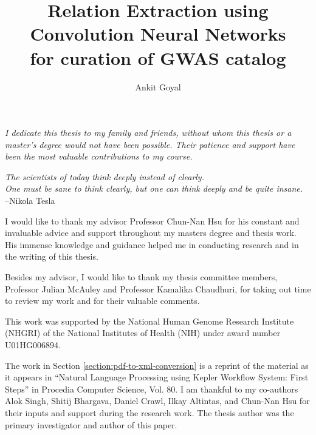 
\title{
Relation Extraction using Convolution Neural Networks\\ 
for curation of GWAS catalog
}

\author{Ankit Goyal}




\begin{frontmatter}

\makefrontmatter

\begin{dedication}
{\it I dedicate this thesis to my family and friends, without whom this thesis or a master's degree would not have been possible. Their patience and support have been the most valuable contributions to my course.}
\end{dedication}

\begin{epigraph}
{\it The scientists of today think deeply instead of clearly. \\
One must be sane to think clearly, but one can think deeply and be quite insane.} \\
\vspace{0.2in}
\textup{--Nikola Tesla}
\end{epigraph}

\tableofcontents
\listoffigures  
\listoftables  

\begin{acknowledgements}
 
I would like to thank my advisor Professor Chun-Nan Hsu for his constant and invaluable advice and support throughout my masters degree and thesis work. His immense knowledge and guidance helped me in conducting research and in the writing of this thesis. 

Besides my advisor, I would like to thank my thesis committee members, Professor Julian McAuley and Professor Kamalika Chaudhuri, for taking out time to review my work and for their valuable comments. 

This work was supported by the National Human Genome Research Institute (NHGRI) of the National Institutes of Health (NIH) under award number U01HG006894.

The work in Section \ref{section:pdf-to-xml-conversion} is a reprint of the material as it appears in ``Natural Language Processing using Kepler Workflow System: First Steps'' in Procedia Computer Science, Vol. 80. I am thankful to my co-authors Alok Singh, Shitij Bhargava, Daniel Crawl, Ilkay Altintas, and Chun-Nan Hsu for their inputs and support during the research work. The thesis author was the primary investigator and author of this paper. 


\end{acknowledgements}
\end{frontmatter}

